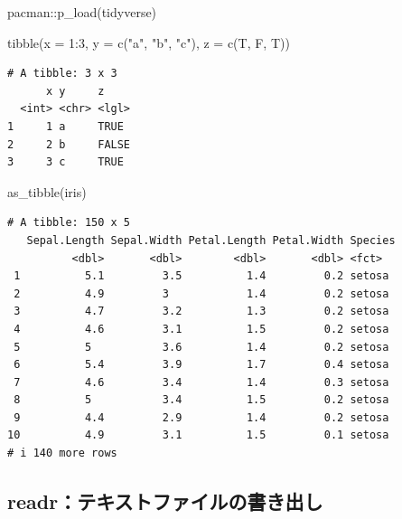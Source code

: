 \documentclass[
  letterpaper,
  DIV=11,
  numbers=noendperiod]{scrreprt}
\newenvironment{Shaded}{\begin{snugshade}}{\end{snugshade}}
\newcommand{\AttributeTok}[1]{\textcolor[rgb]{0.40,0.45,0.13}{#1}}
\newcommand{\DecValTok}[1]{\textcolor[rgb]{0.68,0.00,0.00}{#1}}
\newcommand{\FunctionTok}[1]{\textcolor[rgb]{0.28,0.35,0.67}{#1}}
\newcommand{\NormalTok}[1]{\textcolor[rgb]{0.00,0.23,0.31}{#1}}
\newcommand{\SpecialCharTok}[1]{\textcolor[rgb]{0.37,0.37,0.37}{#1}}
\newcommand{\StringTok}[1]{\textcolor[rgb]{0.13,0.47,0.30}{#1}}
\begin{document}
\begin{Shaded}
\begin{Highlighting}[]
\NormalTok{pacman}\SpecialCharTok{::}\FunctionTok{p\_load}\NormalTok{(tidyverse)}

\FunctionTok{tibble}\NormalTok{(}\AttributeTok{x =} \DecValTok{1}\SpecialCharTok{:}\DecValTok{3}\NormalTok{, }\AttributeTok{y =} \FunctionTok{c}\NormalTok{(}\StringTok{"a"}\NormalTok{, }\StringTok{"b"}\NormalTok{, }\StringTok{"c"}\NormalTok{), }\AttributeTok{z =} \FunctionTok{c}\NormalTok{(T, F, T))}
\end{Highlighting}
\end{Shaded}

\begin{verbatim}
# A tibble: 3 x 3
      x y     z    
  <int> <chr> <lgl>
1     1 a     TRUE 
2     2 b     FALSE
3     3 c     TRUE 
\end{verbatim}

\begin{Shaded}
\begin{Highlighting}[]
\FunctionTok{as\_tibble}\NormalTok{(iris)}
\end{Highlighting}
\end{Shaded}

\begin{verbatim}
# A tibble: 150 x 5
   Sepal.Length Sepal.Width Petal.Length Petal.Width Species
          <dbl>       <dbl>        <dbl>       <dbl> <fct>  
 1          5.1         3.5          1.4         0.2 setosa 
 2          4.9         3            1.4         0.2 setosa 
 3          4.7         3.2          1.3         0.2 setosa 
 4          4.6         3.1          1.5         0.2 setosa 
 5          5           3.6          1.4         0.2 setosa 
 6          5.4         3.9          1.7         0.4 setosa 
 7          4.6         3.4          1.4         0.3 setosa 
 8          5           3.4          1.5         0.2 setosa 
 9          4.4         2.9          1.4         0.2 setosa 
10          4.9         3.1          1.5         0.1 setosa 
# i 140 more rows
\end{verbatim}

\hypertarget{readrux30c6ux30adux30b9ux30c8ux30d5ux30a1ux30a4ux30ebux306eux66f8ux304dux51faux3057}{%
\subsection{readr：テキストファイルの書き出し}\label{readrux30c6ux30adux30b9ux30c8ux30d5ux30a1ux30a4ux30ebux306eux66f8ux304dux51faux3057}}
\end{document}
